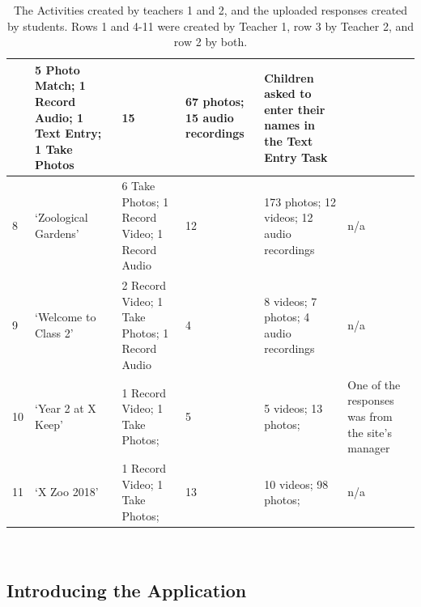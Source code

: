 \begin{table}[]
\begin{tabularx}{\linewidth}{ 
| p{4mm} 
| >{\raggedright\arraybackslash}X 
| >{\raggedright\arraybackslash}X 
| p{13mm}
| >{\raggedright\arraybackslash}X 
| >{\raggedright\arraybackslash}X 
|}
    & \footnotesize 5 Photo Match; 1 Record Audio; 1 Text Entry; 1 Take Photos
    & \footnotesize 15 
    & \footnotesize 67 photos; 15 audio recordings
    & \footnotesize Children asked to enter their names in the Text Entry Task\\
\hline
    \small 8 
    & \footnotesize `Zoological Gardens' 
    & \footnotesize 6 Take Photos; 1 Record Video; 1 Record Audio
    & \footnotesize 12 
    & \footnotesize 173 photos; 12 videos; 12 audio recordings
    & \footnotesize n/a\\
\hline
    \small 9 
    & \footnotesize `Welcome to Class 2' 
    & \footnotesize 2 Record Video; 1 Take Photos; 1 Record Audio
    & \footnotesize 4 
    & \footnotesize 8 videos; 7 photos; 4 audio recordings
    & \footnotesize n/a\\
\hline
    \small 10 
    & \footnotesize `Year 2 at X Keep' 
    & \footnotesize 1 Record Video; 1 Take Photos;
    & \footnotesize 5 
    & \footnotesize 5 videos; 13 photos;
    & \footnotesize One of the responses was from the site's manager\\
    \hline
    \small 11 
    & \footnotesize `X Zoo 2018' 
    & \footnotesize 1 Record Video; 1 Take Photos;
    & \footnotesize 13 
    & \footnotesize 10 videos; 98 photos;
    & \footnotesize n/a\\
\hline
\end{tabularx}
    \caption[The Activities created by teachers 1 and 2, and the uploaded responses created by students.]{The Activities created by teachers 1 and 2, and the uploaded responses created by students. Rows 1 and 4-11 were created by Teacher 1, row 3 by Teacher 2, and row 2 by both.}~\label{tab:TeacherActivities}
\end{table}

\subsection{Introducing the Application}
\label{sec:IntroducingOurPlaceSchool1}

